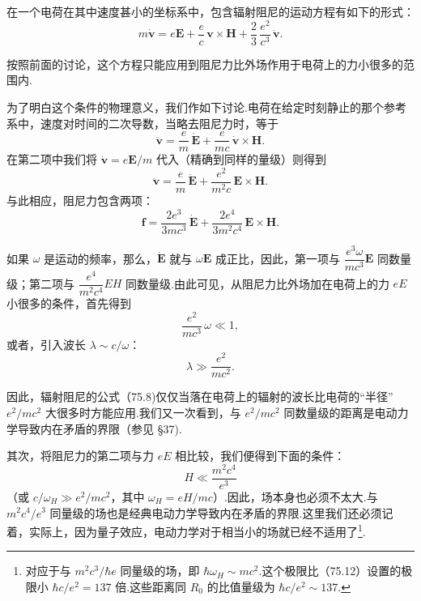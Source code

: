 在一个电荷在其中速度甚小的坐标系中，包含辐射阻尼的运动方程有如下的形式：
\begin{equation}
  m\dot{\boldsymbol{v}}=e\boldsymbol{E}+\frac{e}{c}\,\boldsymbol{v}\times\boldsymbol{H}
  +\frac{2}{3}\,\frac{e^2}{c^3}\,\ddot{\boldsymbol{v}}.
\end{equation}

按照前面的讨论，这个方程只能应用到阻尼力比外场作用于电荷上的力小很多的范围内.

为了明白这个条件的物理意义，我们作如下讨论.电荷在给定时刻静止的那个参考系中，速度对时间的二次导数，当略去阻尼力时，等于
\begin{equation*}
  \ddot{\boldsymbol{v}}=\frac{e}{m}\,\dot{\boldsymbol{E}}
  +\frac{e}{mc}\,\dot{\boldsymbol{v}}\times\boldsymbol{H}.
\end{equation*}
在第二项中我们将 $\dot{\boldsymbol{v}}=e\boldsymbol{E}/m$ 代入（精确到同样的量级）则得到
\begin{equation*}
  \ddot{\boldsymbol{v}}=\frac{e}{m}\,\dot{\boldsymbol{E}}
  +\frac{e^2}{m^2c}\,\boldsymbol{E}\times\boldsymbol{H}.
\end{equation*}
与此相应，阻尼力包含两项：
\begin{equation}
  \boldsymbol{f}=\frac{2e^3}{3mc^3}\,\dot{\boldsymbol{E}}
  +\frac{2e^4}{3m^2c^4}\,\boldsymbol{E}\times\boldsymbol{H}.
\end{equation}

如果 $\omega$ 是运动的频率，那么，$\dot{\boldsymbol{E}}$ 就与 $\omega\boldsymbol{E}$ 成正比，因此，第一项与 $\dfrac{e^3\omega}{mc^3}\boldsymbol{E}$ 同数量级；第二项与 $\dfrac{e^4}{m^2c^4}EH$ 同数量级.由此可见，从阻尼力比外场加在电荷上的力 $eE$ 小很多的条件，首先得到
\begin{equation*}
  \frac{e^2}{mc^3}\,\omega\ll 1,
\end{equation*}
或者，引入波长 $\lambda\sim c/\omega$：
\begin{equation}
  \lambda\gg\frac{e^2}{mc^2}.
\end{equation}

因此，辐射阻尼的公式（75.8)仅仅当落在电荷上的辐射的波长比电荷的“半径” $e^2/mc^2$ 大很多时方能应用.我们又一次看到，与 $e^2/mc^2$ 同数量级的距离是电动力学导致内在矛盾的界限（参见 §37).

其次，将阻尼力的第二项与力 $eE$ 相比较，我们便得到下面的条件：
\begin{equation}
  H\ll\frac{m^2c^4}{e^3}
\end{equation}
（或 $c/\omega_H\gg e^2/mc^2$，其中 $\omega_H=eH/mc$）.因此，场本身也必须不太大.与 $m^2c^4/e^3$ 同量级的场也是经典电动力学导致内在矛盾的界限.这里我们还必须记着，实际上，因为量子效应，电动力学对于相当小的场就已经不适用了\footnote{对应于与 $m^2c^3/\hbar e$ 同量级的场，即 $\hbar\omega_H\sim mc^2$.这个极限比（75.12）设置的极限小 $\hbar c/e^2=137$ 倍.这些距离同 $R_0$ 的比值量级为 $\hbar c/e^2\sim 137$.}.

